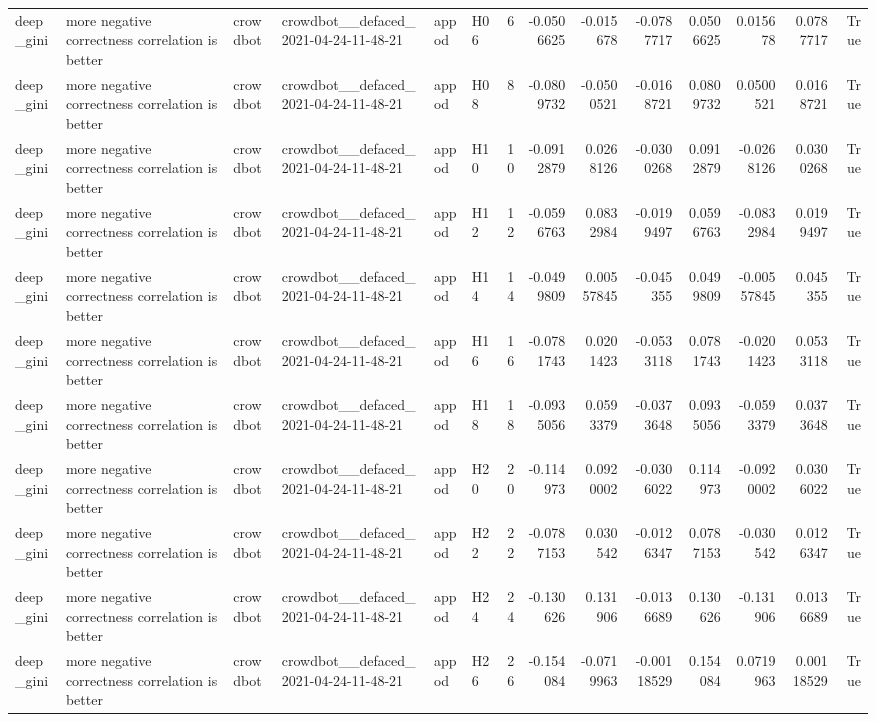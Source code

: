 \begin{longtable}{llllllrrrrrrrr}
deep\_gini & more negative correctness correlation is better & crowdbot & crowdbot\_\_defaced\_2021-04-24-11-48-21 & appod & H06 & 6 & -0.0506625 & -0.015678 & -0.0787717 & 0.0506625 & 0.015678 & 0.0787717 & True \\
deep\_gini & more negative correctness correlation is better & crowdbot & crowdbot\_\_defaced\_2021-04-24-11-48-21 & appod & H08 & 8 & -0.0809732 & -0.0500521 & -0.0168721 & 0.0809732 & 0.0500521 & 0.0168721 & True \\
deep\_gini & more negative correctness correlation is better & crowdbot & crowdbot\_\_defaced\_2021-04-24-11-48-21 & appod & H10 & 10 & -0.0912879 & 0.0268126 & -0.0300268 & 0.0912879 & -0.0268126 & 0.0300268 & True \\
deep\_gini & more negative correctness correlation is better & crowdbot & crowdbot\_\_defaced\_2021-04-24-11-48-21 & appod & H12 & 12 & -0.0596763 & 0.0832984 & -0.0199497 & 0.0596763 & -0.0832984 & 0.0199497 & True \\
deep\_gini & more negative correctness correlation is better & crowdbot & crowdbot\_\_defaced\_2021-04-24-11-48-21 & appod & H14 & 14 & -0.0499809 & 0.00557845 & -0.045355 & 0.0499809 & -0.00557845 & 0.045355 & True \\
deep\_gini & more negative correctness correlation is better & crowdbot & crowdbot\_\_defaced\_2021-04-24-11-48-21 & appod & H16 & 16 & -0.0781743 & 0.0201423 & -0.0533118 & 0.0781743 & -0.0201423 & 0.0533118 & True \\
deep\_gini & more negative correctness correlation is better & crowdbot & crowdbot\_\_defaced\_2021-04-24-11-48-21 & appod & H18 & 18 & -0.0935056 & 0.0593379 & -0.0373648 & 0.0935056 & -0.0593379 & 0.0373648 & True \\
deep\_gini & more negative correctness correlation is better & crowdbot & crowdbot\_\_defaced\_2021-04-24-11-48-21 & appod & H20 & 20 & -0.114973 & 0.0920002 & -0.0306022 & 0.114973 & -0.0920002 & 0.0306022 & True \\
deep\_gini & more negative correctness correlation is better & crowdbot & crowdbot\_\_defaced\_2021-04-24-11-48-21 & appod & H22 & 22 & -0.0787153 & 0.030542 & -0.0126347 & 0.0787153 & -0.030542 & 0.0126347 & True \\
deep\_gini & more negative correctness correlation is better & crowdbot & crowdbot\_\_defaced\_2021-04-24-11-48-21 & appod & H24 & 24 & -0.130626 & 0.131906 & -0.0136689 & 0.130626 & -0.131906 & 0.0136689 & True \\
deep\_gini & more negative correctness correlation is better & crowdbot & crowdbot\_\_defaced\_2021-04-24-11-48-21 & appod & H26 & 26 & -0.154084 & -0.0719963 & -0.00118529 & 0.154084 & 0.0719963 & 0.00118529 & True \\

\end{longtable}
